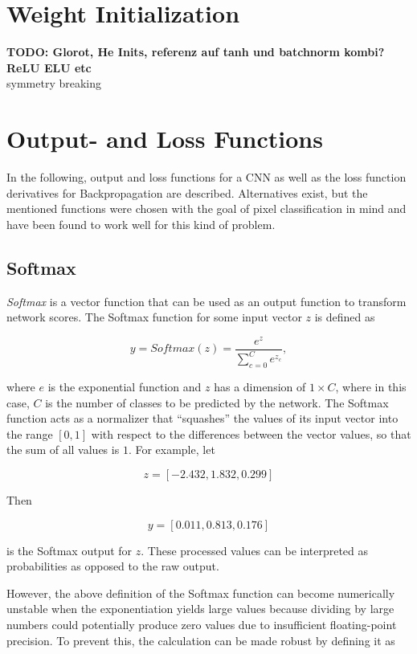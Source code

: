 	\section{Weight Initialization}

	\textbf{TODO: Glorot, He Inits, referenz auf tanh und batchnorm kombi? ReLU ELU etc}\\
	symmetry breaking


	\section {Output- and Loss Functions}
In the following, output and loss functions for a CNN as well as the loss function derivatives for Backpropagation are described. Alternatives exist, but the mentioned functions were chosen with the goal of pixel classification in mind and have been found to work well for this kind of problem.


	\subsection{Softmax}
\label{subsec:softmax}

\textit{Softmax} is a vector function that can be used as an output function to transform network scores. The Softmax function for some input vector $z$ is defined as

\[y = Softmax(z) = \frac{e^{z}}{\sum_{c=0}^{C} e^{z_c}},\]

\noindent where $e$ is the exponential function and $z$ has a dimension of $1 \times C$, where in this case, $C$ is the number of classes to be predicted by the network. The Softmax function acts as a normalizer that ``squashes'' the values of its input vector into the range $[0, 1]$ with respect to the differences between the vector values, so that the sum of all values is $1$. For example, let 

\[ z = [-2.432, 1.832, 0.299] \]

\noindent Then 

\[ y = [0.011, 0.813, 0.176] \]

\noindent is the Softmax output for $z$. These processed values can be interpreted as probabilities as opposed to the raw output.



However, the above definition of the Softmax function can become numerically unstable when the exponentiation yields large values because dividing by large numbers could potentially produce zero values due to insufficient floating-point precision. To prevent this, the calculation can be made robust by defining it as

